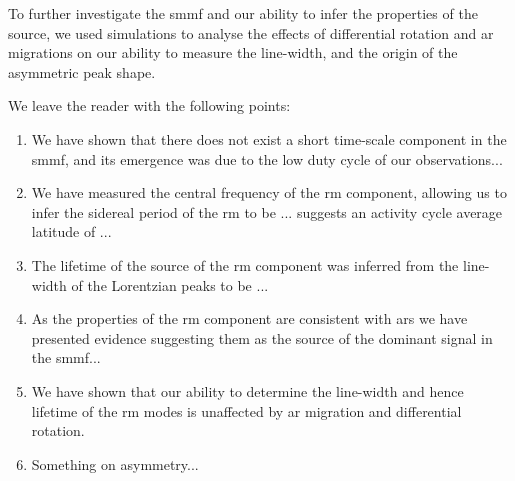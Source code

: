 To further investigate the \gls{smmf} and our ability to infer the properties of the source, we used simulations to analyse the effects of differential rotation and \gls{ar} migrations on our ability to measure the line-width, and the origin of the asymmetric peak shape.

We leave the reader with the following points:

\begin{enumerate}
	\item{We have shown that there does not exist a short time-scale component in the \gls{smmf}, and its emergence was due to the low duty cycle of our observations...}
	
	\item{We have measured the central frequency of the \gls{rm} component, allowing us to infer the sidereal period of the \gls{rm} to be ... suggests an activity cycle average latitude of ... }
	
	\item{The lifetime of the source of the \gls{rm} component was inferred from the line-width of the Lorentzian peaks to be ...}
	
	\item{As the properties of the \gls{rm} component are consistent with \glspl{ar} we have presented evidence suggesting them as the source of the dominant signal in the \gls{smmf}...}
	
	\item{We have shown that our ability to determine the line-width and hence lifetime of the \gls{rm} modes is unaffected by \gls{ar} migration and differential rotation.}
	
	\item{Something on asymmetry...}
\end{enumerate}

